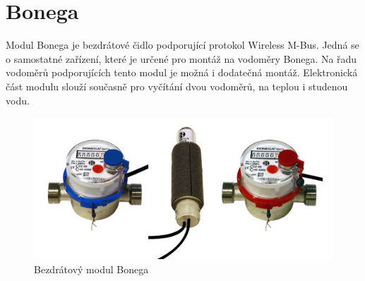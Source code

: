 \begin{table}[!ht]
\begin{tabular}{|c|l|c|}
\end{tabular}
\end{table}


	

	\section{Bonega}

Modul Bonega je bezdrátové čidlo podporující protokol Wireless M-Bus. Jedná se o samostatné zařízení, které je určené pro montáž na vodoměry Bonega. Na řadu vodoměrů podporujících tento modul je možná i dodatečná montáž. Elektronická část modulu slouží současně pro vyčítání dvou vodoměrů, na teplou i studenou vodu.
	
	 \begin{figure}[!ht]
  \begin{center}
    \includegraphics[scale=0.70]{obrazky/zarizeni_bonega}
  \end{center}
  \caption{Bezdrátový modul Bonega~\cite{CidloBonega}}
\end{figure}


